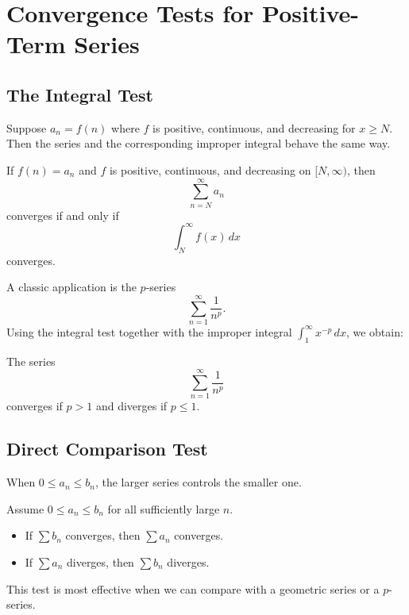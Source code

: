 \chapter*{Convergence Tests for Positive-Term Series}

\section*{The Integral Test}

Suppose $a_n=f(n)$ where $f$ is positive, continuous, and decreasing for $x\ge N$. Then the series and the corresponding improper integral behave the same way.

\begin{theorem}
If $f(n)=a_n$ and $f$ is positive, continuous, and decreasing on $[N,\infty)$, then
$$\sum_{n=N}^{\infty} a_n$$
converges if and only if
$$\int_N^{\infty} f(x)\,dx$$
converges.
\end{theorem}

A classic application is the $p$-series
$$\sum_{n=1}^{\infty} \frac{1}{n^p}.$$ 
Using the integral test together with the improper integral $\int_1^{\infty}x^{-p}\,dx$, we obtain:

\begin{theorem}
The series
$$\sum_{n=1}^{\infty} \frac{1}{n^p}$$
converges if $p>1$ and diverges if $p\le 1$.
\end{theorem}

\section*{Direct Comparison Test}

When $0\le a_n\le b_n$, the larger series controls the smaller one.

\begin{theorem}
Assume $0\le a_n\le b_n$ for all sufficiently large $n$.
\begin{itemize}
    \item If $\sum b_n$ converges, then $\sum a_n$ converges.
    \item If $\sum a_n$ diverges, then $\sum b_n$ diverges.
\end{itemize}
\end{theorem}

This test is most effective when we can compare with a geometric series or a $p$-series.

